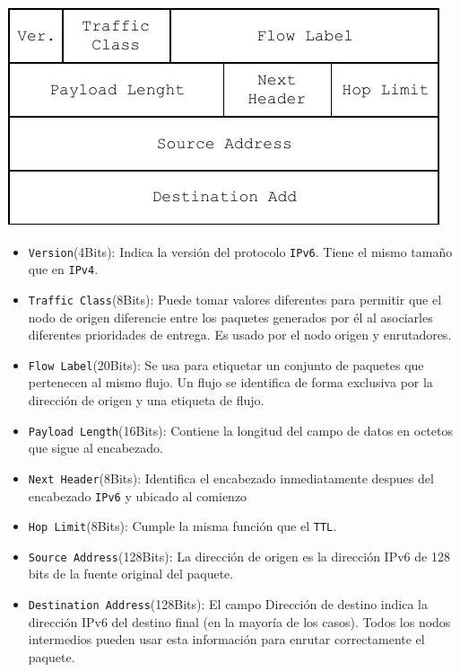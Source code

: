 \begin{center}
\includegraphics[page=1,scale=0.8]{IPv6.pdf}
\end{center}

\begin{itemize}
\item \texttt{Version}(4Bits): Indica la versión del protocolo \texttt{IPv6}. Tiene el mismo tamaño que en \texttt{IPv4}.
\item \texttt{Traffic Class}(8Bits): Puede tomar valores diferentes para permitir que el nodo de origen diferencie entre los paquetes generados por él al asociarles diferentes prioridades de entrega. Es usado por el nodo origen y enrutadores.
\item \texttt{Flow Label}(20Bits): Se usa para etiquetar un conjunto de paquetes que pertenecen al mismo flujo. Un flujo se identifica de forma exclusiva por la dirección de origen y una etiqueta de flujo.
\item \texttt{Payload Length}(16Bits): Contiene la longitud del campo de datos en octetos que sigue al encabezado.
\item \texttt{Next Header}(8Bits): Identifica el encabezado inmediatamente despues del encabezado \texttt{IPv6} y ubicado al comienzo
\item \texttt{Hop Limit}(8Bits): Cumple la misma función que el \texttt{TTL}.
\item \texttt{Source Address}(128Bits): La dirección de origen es la dirección IPv6 de 128 bits de la fuente original del paquete.
\item \texttt{Destination Address}(128Bits): El campo Dirección de destino indica la dirección IPv6 del destino final (en la mayoría de los casos). Todos los nodos intermedios pueden usar esta información para enrutar correctamente el paquete.
\end{itemize}


